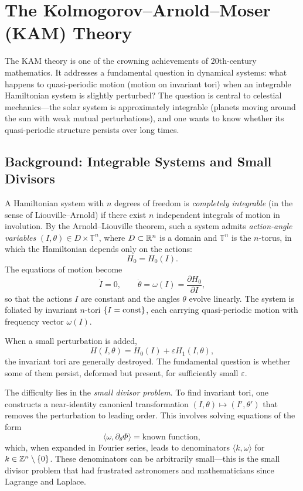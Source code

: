 \section{The Kolmogorov--Arnold--Moser (KAM) Theory}

The KAM theory is one of the crowning achievements of 20th-century mathematics. It addresses a fundamental question in dynamical systems: what happens to quasi-periodic motion (motion on invariant tori) when an integrable Hamiltonian system is slightly perturbed? The question is central to celestial mechanics---the solar system is approximately integrable (planets moving around the sun with weak mutual perturbations), and one wants to know whether its quasi-periodic structure persists over long times.

\subsection{Background: Integrable Systems and Small Divisors}

A Hamiltonian system with $n$ degrees of freedom is \textit{completely integrable} (in the sense of Liouville--Arnold) if there exist $n$ independent integrals of motion in involution. By the Arnold--Liouville theorem, such a system admits \textit{action-angle variables} $(I, \theta) \in D \times \mathbb{T}^n$, where $D \subset \mathbb{R}^n$ is a domain and $\mathbb{T}^n$ is the $n$-torus, in which the Hamiltonian depends only on the actions:
\[
H_0 = H_0(I).
\]
The equations of motion become
\[
\dot{I} = 0, \qquad \dot{\theta} = \omega(I) = \frac{\partial H_0}{\partial I},
\]
so that the actions $I$ are constant and the angles $\theta$ evolve linearly. The system is foliated by invariant $n$-tori $\{I = \operatorname{const}\}$, each carrying quasi-periodic motion with frequency vector $\omega(I)$.

When a small perturbation is added,
\[
H(I,\theta) = H_0(I) + \varepsilon H_1(I,\theta),
\]
the invariant tori are generally destroyed. The fundamental question is whether some of them persist, deformed but present, for sufficiently small $\varepsilon$.

The difficulty lies in the \textit{small divisor problem}. To find invariant tori, one constructs a near-identity canonical transformation $(I,\theta) \mapsto (I',\theta')$ that removes the perturbation to leading order. This involves solving equations of the form
\[
\langle \omega, \partial_\theta \Phi \rangle = \text{known function},
\]
which, when expanded in Fourier series, leads to denominators $\langle k, \omega \rangle$ for $k \in \mathbb{Z}^n \setminus \{0\}$. These denominators can be arbitrarily small---this is the small divisor problem that had frustrated astronomers and mathematicians since Lagrange and Laplace.

